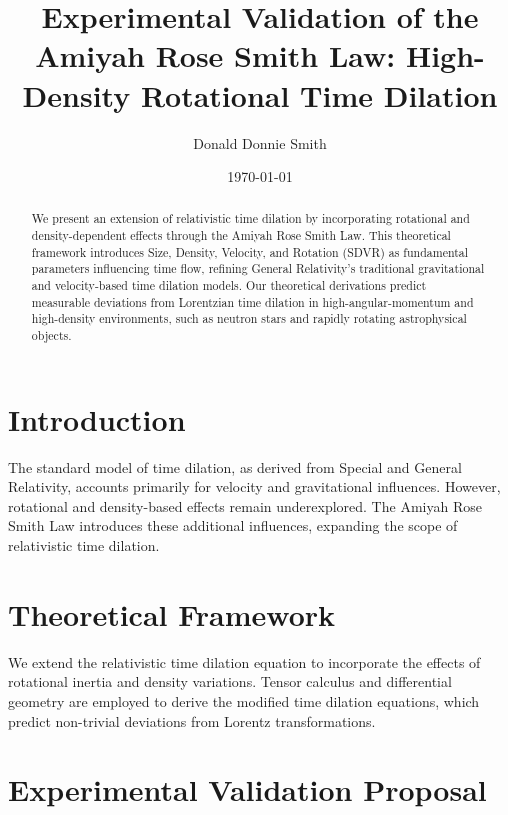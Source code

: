 \documentclass[aps,prl,twocolumn,superscriptaddress]{revtex4-2}
\begin{document}
\title{Experimental Validation of the Amiyah Rose Smith Law: High-Density Rotational Time Dilation}

\author{Donald Donnie Smith}

\date{\today}

\begin{abstract}
We present an extension of relativistic time dilation by incorporating rotational and density-dependent effects through the Amiyah Rose Smith Law. This theoretical framework introduces Size, Density, Velocity, and Rotation (SDVR) as fundamental parameters influencing time flow, refining General Relativity’s traditional gravitational and velocity-based time dilation models. Our theoretical derivations predict measurable deviations from Lorentzian time dilation in high-angular-momentum and high-density environments, such as neutron stars and rapidly rotating astrophysical objects.
\end{abstract}

\maketitle

\section{Introduction}

The standard model of time dilation, as derived from Special and General Relativity, accounts primarily for velocity and gravitational influences. However, rotational and density-based effects remain underexplored. The Amiyah Rose Smith Law introduces these additional influences, expanding the scope of relativistic time dilation.

\section{Theoretical Framework}

We extend the relativistic time dilation equation to incorporate the effects of rotational inertia and density variations. Tensor calculus and differential geometry are employed to derive the modified time dilation equations, which predict non-trivial deviations from Lorentz transformations.

\section{Experimental Validation Proposal}
\end{document}
